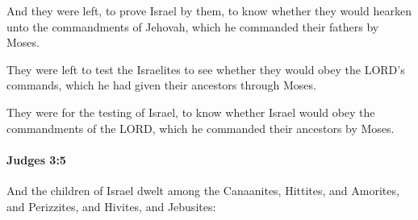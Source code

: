 			\begin{versebox}
					\item[BHS] 
					\item[ASV] And they were left, to prove Israel by them, to know whether they would hearken unto the commandments of Jehovah, which he commanded their fathers by Moses.
					\item[NIV] They were left to test the Israelites to see whether they would obey the LORD’s commands, which he had given their ancestors through Moses.
					\item[NRSV] They were for the testing of Israel, to know whether Israel would obey the commandments of the LORD, which he commanded their ancestors by Moses.
			\end{versebox}

		\paragraph{Judges 3:5} %
			\label{JUDGES-3-5}

			And the children of Israel dwelt among the Canaanites, Hittites, and Amorites, and Perizzites, and Hivites, and Jebusites:

